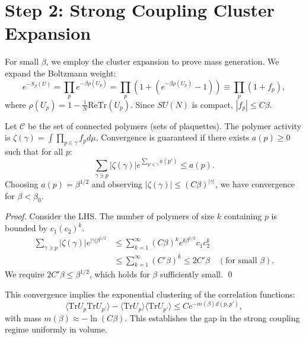 \section{Step 2: Strong Coupling Cluster Expansion}
\label{sec:strong-coupling-proof}

For small $\beta$, we employ the cluster expansion to prove mass generation. We expand the Boltzmann weight:
\begin{equation}
e^{-S_\beta(U)} = \prod_p e^{-\beta \rho(U_p)} = \prod_p (1 + (e^{-\beta \rho(U_p)} - 1)) \equiv \prod_p (1 + f_p),
\end{equation}
where $\rho(U_p) = 1 - \frac{1}{N}\text{ReTr}(U_p)$. Since $SU(N)$ is compact, $|f_p| \le C \beta$.

\begin{lemma}
Let $\mathcal{C}$ be the set of connected polymers (sets of plaquettes). The polymer activity is $\zeta(\gamma) = \int \prod_{p \in \gamma} f_p d\mu$.
Convergence is guaranteed if there exists $a(p) \ge 0$ such that for all $p$:
\begin{equation}
\sum_{\gamma \ni p} |\zeta(\gamma)| e^{\sum_{p' \in \gamma} a(p')} \le a(p).
\end{equation}
Choosing $a(p) = \beta^{1/2}$ and observing $|\zeta(\gamma)| \le (C\beta)^{|\gamma|}$, we have convergence for $\beta < \beta_0$.
\end{lemma}

\begin{proof}
Consider the LHS. The number of polymers of size $k$ containing $p$ is bounded by $c_1 (c_2)^k$.
\begin{align}
\sum_{\gamma \ni p} |\zeta(\gamma)| e^{|\gamma| \beta^{1/2}} &\le \sum_{k=1}^\infty (C \beta)^k e^{k \beta^{1/2}} c_1 c_2^k \\
&\le \sum_{k=1}^\infty (C' \beta)^k \le 2 C' \beta \quad (\text{for small } \beta).
\end{align}
We require $2 C' \beta \le \beta^{1/2}$, which holds for $\beta$ sufficiently small. \qed
\end{proof}

This convergence implies the exponential clustering of the correlation functions:
\begin{equation}
\langle \text{Tr}U_p \text{Tr}U_{p'} \rangle - \langle \text{Tr}U_p \rangle \langle \text{Tr}U_{p'} \rangle \le C e^{-m(\beta) d(p, p')},
\end{equation}
with mass $m(\beta) \approx - \ln(C\beta)$. This establishes the gap in the strong coupling regime uniformly in volume.

